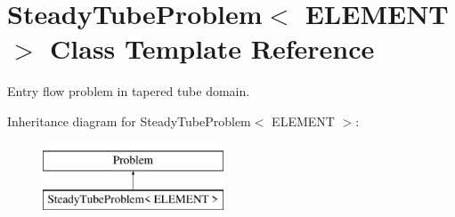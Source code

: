 \hypertarget{classSteadyTubeProblem}{}\section{Steady\+Tube\+Problem$<$ E\+L\+E\+M\+E\+NT $>$ Class Template Reference}
\label{classSteadyTubeProblem}


Entry flow problem in tapered tube domain.  


Inheritance diagram for Steady\+Tube\+Problem$<$ E\+L\+E\+M\+E\+NT $>$\+:\begin{figure}[H]
\begin{center}
\leavevmode
\includegraphics[height=2.000000cm]{classSteadyTubeProblem}
\end{center}
\end{figure}
